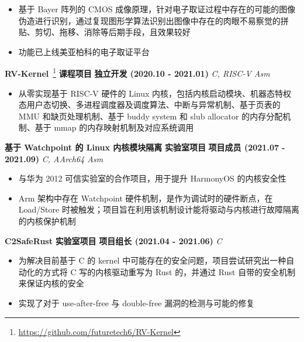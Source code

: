         \begin{itemize}
            \item 基于 Bayer 阵列的 CMOS 成像原理，针对电子取证过程中存在的可能的图像伪造进行识别，通过复现图形学算法识别出图像中存在的肉眼不易察觉的拼贴、剪切、拖移、消除等后期手段，且效果较好
            \item 功能已上线美亚柏科的电子取证平台
        \end{itemize}

    \fi

    \noindent \textbf{RV-Kernel}~\footnote{\url{https://github.com/futuretech6/RV-Kernel}} \textbar{} \textbf{课程项目}
    \textbar{} \textbf{独立开发 (2020.10 - 2021.01)} \hfill \textsl{C, RISC-V Asm}

    \begin{itemize}
        \item 从零实现基于 RISC-V 硬件的 Linux 内核，包括内核启动模块、机器态特权态用户态切换、多进程调度器及调度算法、中断与异常机制、基于页表的 MMU 和缺页处理机制、基于 buddy system 和 slub allocator 的内存分配机制、基于 mmap 的内存映射机制及对应系统调用
    \end{itemize}

    \noindent \textbf{基于 Watchpoint 的 Linux 内核模块隔离} \textbar{} \textbf{实验室项目} \textbar{} \textbf{项目成员 (2021.07 -
    2021.09)} \hfill \textsl{C, AArch64 Asm}

    \begin{itemize}
        \item 与华为 2012 可信实验室的合作项目，用于提升 HarmonyOS 的内核安全性
        \item Arm 架构中存在 Watchpoint 硬件机制，是作为调试时的硬件断点，在 Load/Store 时被触发；项目旨在利用该机制设计能将驱动与内核进行故障隔离的内核保护机制
    \end{itemize}

    \ifdefined\qr\else



        \noindent \textbf{C2SafeRust} \textbar{} \textbf{实验室项目} \textbar{} \textbf{项目组长 (2021.04 - 2021.06)} \hfill
        \textsl{C}

        \begin{itemize}
            \item 为解决目前基于 C 的 kernel 中可能存在的安全问题，项目尝试研究出一种自动化的方式将 C 写的内核驱动重写为 Rust 的，并通过 Rust 自带的安全机制来保证内核的安全
            \item 实现了对于 use-after-free 与 double-free 漏洞的检测与可能的修复
        \end{itemize}

    \fi

\fi
